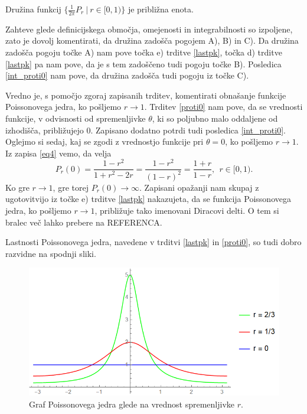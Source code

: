 \documentclass[mat1, tisk]{fmfdelo}
\begin{document}
    \begin{trditev}
        Družina funkcij $\{ \frac{1}{2 \pi} P_r~|~r \in [0,1)\}$ je približna enota.
    \end{trditev}
    \begin{dokaz}
        Zahteve glede definicijskega območja, omejenosti in integrabilnosti so izpoljene, zato je dovolj komentirati, da družina zadošča pogojem A), B) in C). 
        Da družina zadošča pogoju točke A) nam pove točka e) trditve \ref{lastpk}, točka d) trditve \ref{lastpk} pa nam pove, da je s tem zadoščeno tudi pogoju točke B). 
        Posledica \ref{int_proti0} nam pove, da družina zadošča tudi pogoju iz točke C).
    \end{dokaz}
    \begin{opomba}
        Vredno je, s pomočjo zgoraj zapisanih trditev, komentirati obnašanje funkcije Poissonovega jedra, ko pošljemo $r \to 1$. Trditev \ref{proti0} nam pove, da se vrednosti funkcije, v odvisnosti od spremenljivke $\theta$, ki so poljubno malo oddaljene od izhodišča, približujejo $0$. 
        Zapisano dodatno potrdi tudi posledica \ref{int_proti0}.
        Oglejmo si sedaj, kaj se zgodi z vrednostjo funkcije pri $\theta = 0$, ko pošljemo $r \to 1$. Iz zapisa \eqref{eq4} vemo, da velja
        $$
        P_r(0) = \frac{1-r^2}{1+ r^2 - 2r} = \frac{1- r^2}{(1 - r)^2} = \frac{1 + r}{1 -r},~~r \in [0,1).
        $$
        Ko gre $r \to 1$, gre torej $P_r(0) \to \infty$. Zapisani opažanji nam skupaj z ugotovitvijo iz točke e) trditve \ref{lastpk} nakazujeta, da se funkcija Poissonovega jedra, ko pošljemo $r \to 1$, približuje tako imenovani Diracovi delti. 
        O tem si bralec več lahko prebere na REFERENCA.
    \end{opomba}

    \begin{opomba}
        Lastnosti Poissonovega jedra, navedene v trditvi \ref{lastpk} in \ref{proti0}, so tudi dobro razvidne na spodnji sliki. 
    \end{opomba}

    \begin{figure}[H]
        \begin{center}
        \includegraphics[width=\linewidth]{grafi.png}
        \caption{Graf Poissonovega jedra glede na vrednost spremenljivke $r$.}
        \end{center}    
    \end{figure}
\end{document}
